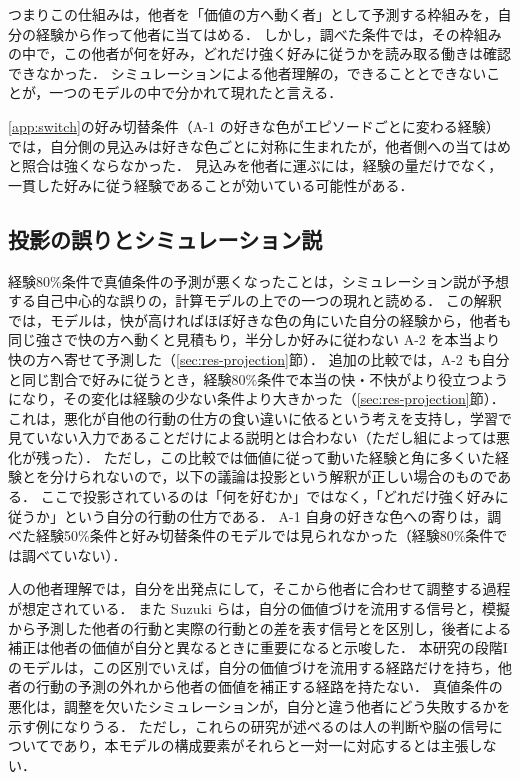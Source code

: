 つまりこの仕組みは，他者を「価値の方へ動く者」として予測する枠組みを，自分の経験から作って他者に当てはめる．
しかし，調べた条件では，その枠組みの中で，この他者が何を好み，どれだけ強く好みに従うかを読み取る働きは確認できなかった．
シミュレーションによる他者理解の，できることとできないことが，一つのモデルの中で分かれて現れたと言える．

\ref{app:switch}の好み切替条件（A-1 の好きな色がエピソードごとに変わる経験）では，自分側の見込みは好きな色ごとに対称に生まれたが，他者側への当てはめと照合は強くならなかった．
見込みを他者に運ぶには，経験の量だけでなく，一貫した好みに従う経験であることが効いている可能性がある．

\subsection{投影の誤りとシミュレーション説}\label{sec:disc-projection}
経験80\%条件で真値条件の予測が悪くなったことは，シミュレーション説が予想する自己中心的な誤り\cite{goldman2006simulating}の，計算モデルの上での一つの現れと読める．
この解釈では，モデルは，快が高ければほぼ好きな色の角にいた自分の経験から，他者も同じ強さで快の方へ動くと見積もり，半分しか好みに従わない A-2 を本当より快の方へ寄せて予測した（\ref{sec:res-projection}節）．
追加の比較では，A-2 も自分と同じ割合で好みに従うとき，経験80\%条件で本当の快・不快がより役立つようになり，その変化は経験の少ない条件より大きかった（\ref{sec:res-projection}節）．
これは，悪化が自他の行動の仕方の食い違いに依るという考えを支持し，学習で見ていない入力であることだけによる説明とは合わない（ただし組によっては悪化が残った）．
ただし，この比較では価値に従って動いた経験と角に多くいた経験とを分けられないので，以下の議論は投影という解釈が正しい場合のものである．
ここで投影されているのは「何を好むか」ではなく，「どれだけ強く好みに従うか」という自分の行動の仕方である．
A-1 自身の好きな色への寄りは，調べた経験50\%条件と好み切替条件のモデルでは見られなかった（経験80\%条件では調べていない）．

人の他者理解では，自分を出発点にして，そこから他者に合わせて調整する過程が想定されている\cite{epley2004perspective,tamir2010neural}．
また Suzuki ら\cite{suzuki2012learning}は，自分の価値づけを流用する信号と，模擬から予測した他者の行動と実際の行動との差を表す信号とを区別し，後者による補正は他者の価値が自分と異なるときに重要になると示唆した．
本研究の段階Iのモデルは，この区別でいえば，自分の価値づけを流用する経路だけを持ち，他者の行動の予測の外れから他者の価値を補正する経路を持たない．
真値条件の悪化は，調整を欠いたシミュレーションが，自分と違う他者にどう失敗するかを示す例になりうる．
ただし，これらの研究が述べるのは人の判断や脳の信号についてであり，本モデルの構成要素がそれらと一対一に対応するとは主張しない．

